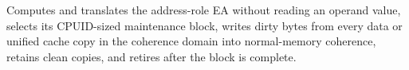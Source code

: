 Computes and translates the address-role EA without reading an operand value, selects its CPUID-sized maintenance block, writes dirty bytes from every data or unified cache copy in the coherence domain into normal-memory coherence, retains clean copies, and retires after the block is complete.

